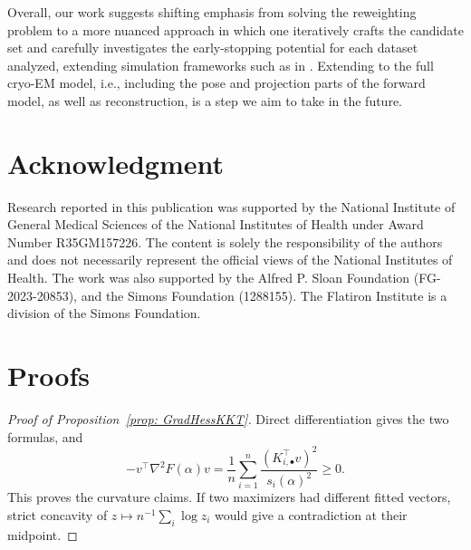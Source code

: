 \documentclass[12pt]{iopart}
\theoremstyle{remark}
\begin{document}
Overall, our work suggests shifting emphasis from solving the reweighting problem to a more nuanced approach in which one iteratively crafts the candidate set and carefully investigates the early-stopping potential for each dataset analyzed,  extending simulation frameworks such as in \cite{silva2026cryo}. Extending to the full cryo-EM model, i.e., including the pose and projection parts of the forward model, as well as reconstruction, is a step we aim to take in the future.

\section*{Acknowledgment}
Research reported in this publication was supported by the National Institute of General Medical Sciences of the National Institutes of Health under Award Number R35GM157226. The content is solely the responsibility of the authors and does not necessarily represent the official views of the National Institutes of Health. 
The work was also supported by the Alfred P. Sloan Foundation (FG-2023-20853), and the Simons Foundation (1288155). The Flatiron Institute is a division of the Simons Foundation.

\newpage
 \printbibliography
\appendix
\markboth{}{}

\newpage
\section{Proofs}
\label{sec: Proofs}

\begin{proof}[Proof of Proposition~\ref{prop: GradHessKKT}]
Direct differentiation gives the two formulas, and
\[
-v^\top\nabla^2F(\alpha)v
=\frac1n\sum_{i=1}^n
\frac{(K_{i,\bullet}^\top v)^2}{s_i(\alpha)^2}\geq0.
\]
This proves the curvature claims. If two maximizers had different fitted
vectors, strict concavity of $z\mapsto n^{-1}\sum_i\log z_i$ would give a
contradiction at their midpoint.
\end{proof}
\end{document}
